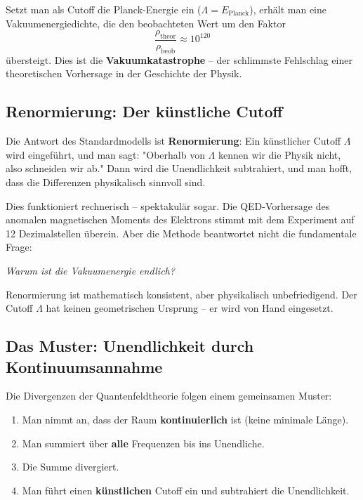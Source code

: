 	Setzt man als Cutoff die Planck-Energie ein ($\Lambda = E_{\text{Planck}}$), erhält man eine Vakuumenergiedichte, die den beobachteten Wert um den Faktor
	\begin{equation}
		\frac{\rho_{\text{theor}}}{\rho_{\text{beob}}} \approx 10^{120}
	\end{equation}
	übersteigt. Dies ist die \textbf{Vakuumkatastrophe} -- der schlimmste Fehlschlag einer theoretischen Vorhersage in der Geschichte der Physik.
	
	\subsection{Renormierung: Der künstliche Cutoff}
	
	Die Antwort des Standardmodells ist \textbf{Renormierung}: Ein künstlicher Cutoff $\Lambda$ wird eingeführt, und man sagt: "Oberhalb von $\Lambda$ kennen wir die Physik nicht, also schneiden wir ab." Dann wird die Unendlichkeit subtrahiert, und man hofft, dass die Differenzen physikalisch sinnvoll sind.
	
	Dies funktioniert rechnerisch -- spektakulär sogar. Die QED-Vorhersage des anomalen magnetischen Moments des Elektrons stimmt mit dem Experiment auf 12 Dezimalstellen überein. Aber die Methode beantwortet nicht die fundamentale Frage:
	
	\begin{center}
		\textit{Warum ist die Vakuumenergie endlich?}
	\end{center}
	
	Renormierung ist mathematisch konsistent, aber physikalisch unbefriedigend. Der Cutoff $\Lambda$ hat keinen geometrischen Ursprung -- er wird von Hand eingesetzt.
	
	\subsection{Das Muster: Unendlichkeit durch Kontinuumsannahme}
	
	Die Divergenzen der Quantenfeldtheorie folgen einem gemeinsamen Muster:
	
	\begin{enumerate}
		\item Man nimmt an, dass der Raum \textbf{kontinuierlich} ist (keine minimale Länge).
		\item Man summiert über \textbf{alle} Frequenzen bis ins Unendliche.
		\item Die Summe divergiert.
		\item Man führt einen \textbf{künstlichen} Cutoff ein und subtrahiert die Unendlichkeit.
	\end{enumerate}
	
